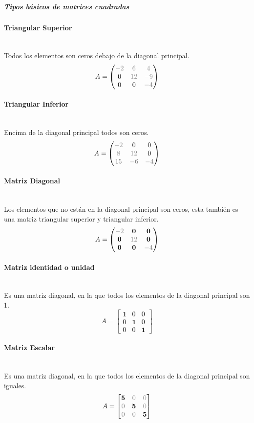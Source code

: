 \documentclass[stu, 12pt, a4paper, donotrepeattitle, floatsintext, natbib]{apa7}
\newcommand{\myparagraph}[1]{\paragraph{#1}\mbox{}\\}
\begin{document}
    \subparagraph{Tipos básicos de matrices cuadradas}
    \myparagraph{Triangular Superior}
    Todos los elementos son ceros debajo de la diagonal principal.
    \[
        A=\begin{pmatrix}
              \color{gray} -2 & \color{gray} 6  & \color{gray} 4  \\
              0               & \color{gray} 12 & \color{gray} -9 \\
              0               & 0               & \color{gray} -4
        \end{pmatrix}
    \]
    \myparagraph{Triangular Inferior}
    Encima de la diagonal principal todos son ceros.
    \[
        A=\begin{pmatrix}
              \color{gray} -2 & 0               & 0               \\
              \color{gray} 8  & \color{gray} 12 & 0               \\
              \color{gray} 15 & \color{gray} -6 & \color{gray} -4
        \end{pmatrix}
    \]
    \myparagraph{Matriz Diagonal}
    Los elementos que no están en la diagonal principal son ceros, esta también es una matriz triangular superior y triangular inferior.
    \[
        A=\begin{pmatrix}
              \color{gray} -2 & \textbf{0}      & \textbf{0}      \\
              \textbf{0}      & \color{gray} 12 & \textbf{0}      \\
              \textbf{0}      & \textbf{0}      & \color{gray} -4
        \end{pmatrix}
    \]
    \myparagraph{Matriz identidad o unidad}
    Es una matriz diagonal, en la que todos los elementos de la diagonal principal son 1.
    \[
        A=\begin{bmatrix}
              \textbf{1} & 0          & 0          \\
              0          & \textbf{1} & 0          \\
              0          & 0          & \textbf{1}
        \end{bmatrix}
    \]
    \myparagraph{Matriz Escalar}
    Es una matriz diagonal, en la que todos los elementos de la diagonal principal son iguales.
    \[
        A=\begin{bmatrix}
              \textbf{5}     & \color{gray} 0 & \color{gray} 0 \\
              \color{gray} 0 & \textbf{5}     & \color{gray} 0 \\
              \color{gray}0  & \color{gray} 0 & \textbf{5}
        \end{bmatrix}
    \]
\end{document}
